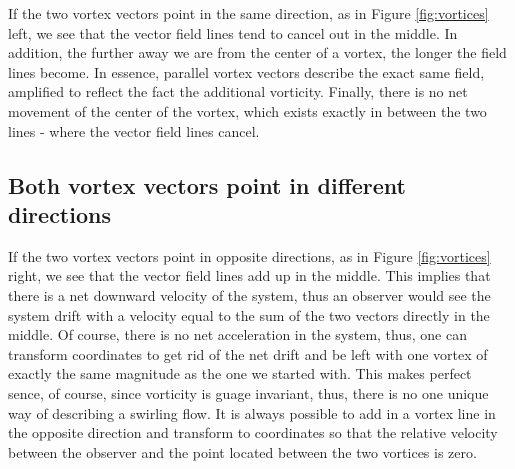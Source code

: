 \documentclass[english]{article}
\begin{document}
If the two vortex vectors point in the same direction, as in Figure 
\ref{fig:vortices} left, we see that the vector field lines tend to cancel
out in the middle. 
In addition, the further away we are from the center of a vortex, the 
longer the field lines become.
In essence, parallel vortex vectors describe the exact same field, amplified
to reflect the fact the additional vorticity.
Finally, there is no net movement of the center of the vortex, which exists
exactly in between the two lines - where the vector field lines cancel.

\subsection{Both vortex vectors point in different directions}
If the two vortex vectors point in opposite directions, as in Figure 
\ref{fig:vortices} right, we see that the vector field lines add up in the
middle.
This implies that there is a net downward velocity of the system, thus
an observer would see the system drift with a velocity equal to the sum 
of the two vectors directly in the middle.
Of course, there is no net acceleration in the system, thus, one can
transform coordinates to get rid of the net drift and be left with one
vortex of exactly the same magnitude as the one we started with.
This makes perfect sence, of course, since vorticity is guage invariant, 
thus, there is no one unique way of describing a swirling flow.
It is always possible to add in a vortex line in the opposite direction
and transform to coordinates so that the relative velocity between the
observer and the point located between the two vortices is zero.
\end{document}
